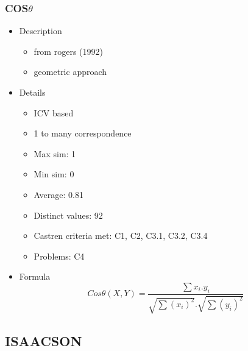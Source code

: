 \documentclass{article}
\begin{document}
\subsubsection{COS$\theta$}
\label{sec-6-4-3}
\begin{itemize}

\item Description
\label{sec-6-4-3-1}%
\begin{itemize}
\item from rogers (1992)
\item geometric approach
\end{itemize}

\item Details
\label{sec-6-4-3-2}%
\begin{itemize}
\item ICV based
\item 1 to many correspondence
\item Max sim: 1
\item Min sim: 0
\item Average: 0.81
\item Distinct values: 92
\item Castren criteria met: C1, C2, C3.1, C3.2, C3.4
\item Problems: C4
\end{itemize}

\item Formula\\
\label{sec-6-4-3-3}%
$$
Cos\theta(X,Y)=\frac{\sum{x_i.y_i}}{\sqrt{\sum{(x_i)^2}}.\sqrt{\sum{(y_i)^2}}}
$$
\end{itemize} %
\subsection{ISAACSON}
\label{sec-6-5}
\end{document}
